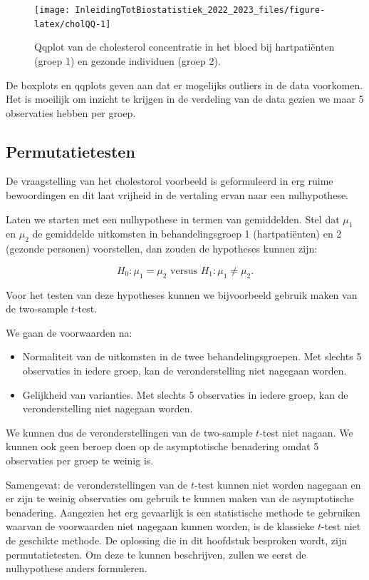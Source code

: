 \documentclass[
  12pt,dutch,coursenotes]{book}
\providecommand{\tightlist}{%
  \setlength{\itemsep}{0pt}\setlength{\parskip}{0pt}}
\begin{document}
\begin{figure}

{\centering \texttt{[image: InleidingTotBiostatistiek\_2022\_2023\_files/figure-latex/cholQQ-1]} 

}

\caption{Qqplot van de cholesterol concentratie in het bloed bij hartpatiënten (groep 1) en gezonde individuen (groep 2).}\label{fig:cholQQ}
\end{figure}

De boxplots en qqplots geven aan dat er mogelijks outliers in de data voorkomen.
Het is moeilijk om inzicht te krijgen in de verdeling van de data gezien we maar 5 observaties hebben per groep.

\hypertarget{permutatietesten}{%
\subsection{Permutatietesten}\label{permutatietesten}}

De vraagstelling van het cholestorol voorbeeld is geformuleerd in erg ruime bewoordingen en dit laat vrijheid in de vertaling ervan naar een nulhypothese.

Laten we starten met een nulhypothese in termen van gemiddelden. Stel dat \(\mu_1\) en \(\mu_2\) de gemiddelde uitkomsten in behandelingsgroep 1 (hartpatiënten) en 2 (gezonde personen) voorstellen, dan zouden de hypotheses kunnen zijn:

\[H_0: \mu_1=\mu_2 \text{ versus } H_1: \mu_1\neq \mu_2.\]

Voor het testen van deze hypotheses kunnen we bijvoorbeeld gebruik maken van de two-sample \(t\)-test.

We gaan de voorwaarden na:

\begin{itemize}
\tightlist
\item
  Normaliteit van de uitkomsten in de twee behandelingsgroepen. Met slechts 5 observaties in iedere groep, kan de veronderstelling niet nagegaan worden.
\item
  Gelijkheid van varianties. Met slechts 5 observaties in iedere groep, kan de veronderstelling niet nagegaan worden.
\end{itemize}

We kunnen dus de veronderstellingen van de two-sample \(t\)-test niet nagaan.
We kunnen ook geen beroep doen op de asymptotische benadering omdat 5 observaties per groep te weinig is.

Samengevat: de veronderstellingen van de \(t\)-test kunnen niet worden nagegaan en er zijn te weinig observaties om gebruik te kunnen maken van de asymptotische benadering. Aangezien het erg gevaarlijk is een statistische methode te gebruiken waarvan de voorwaarden niet nagegaan kunnen worden, is de klassieke \(t\)-test niet de geschikte methode. De oplossing die in dit hoofdstuk besproken wordt, zijn permutatietesten.
Om deze te kunnen beschrijven, zullen we eerst de nulhypothese anders formuleren.
\end{document}
